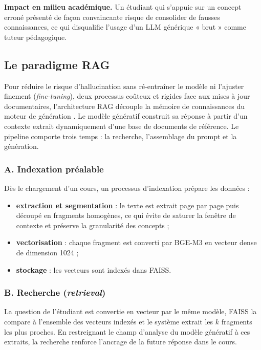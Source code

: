 \documentclass[12pt,a4paper,oneside]{report}
\begin{document}
\textbf{Impact en milieu académique.} Un étudiant qui s'appuie sur un concept erroné présenté de façon convaincante risque de consolider de fausses connaissances, ce qui disqualifie l'usage d'un LLM générique « brut » comme tuteur pédagogique.

\subsection{Le paradigme RAG}

Pour réduire le risque d'hallucination sans ré-entraîner le modèle ni l'ajuster finement (\emph{fine-tuning}), deux processus coûteux et rigides face aux mises à jour documentaires, l'architecture RAG découple la mémoire de connaissances du moteur de génération \cite{lewis2020rag}. Le modèle génératif construit sa réponse à partir d'un contexte extrait dynamiquement d'une base de documents de référence. Le pipeline comporte trois temps : la recherche, l'assemblage du prompt et la génération.

\subsubsection*{A. Indexation préalable}

Dès le chargement d'un cours, un processus d'indexation prépare les données :
\begin{itemize}[nosep]
  \item \textbf{extraction et segmentation} : le texte est extrait page par page puis découpé en fragments homogènes, ce qui évite de saturer la fenêtre de contexte et préserve la granularité des concepts ;
  \item \textbf{vectorisation} : chaque fragment est converti par BGE-M3 en vecteur dense de dimension 1024 ;
  \item \textbf{stockage} : les vecteurs sont indexés dans FAISS.
\end{itemize}

\subsubsection*{B. Recherche (\emph{retrieval})}

La question de l'étudiant est convertie en vecteur par le même modèle, FAISS la compare à l'ensemble des vecteurs indexés et le système extrait les $k$ fragments les plus proches. En restreignant le champ d'analyse du modèle génératif à ces extraits, la recherche renforce l'ancrage de la future réponse dans le cours.
\end{document}
